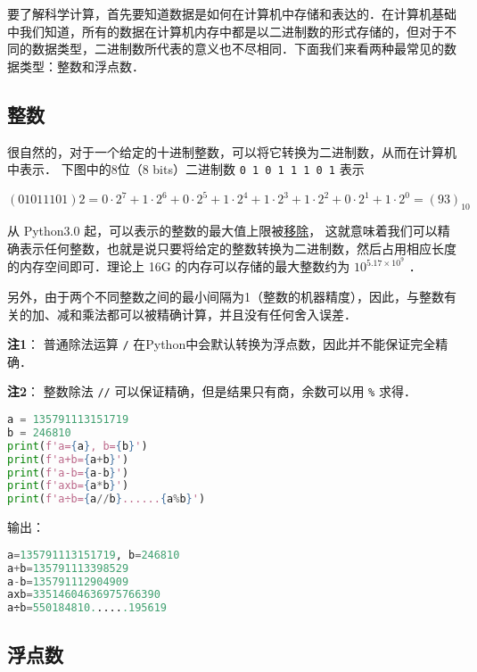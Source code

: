 

要了解科学计算，首先要知道数据是如何在计算机中存储和表达的．在计算机基础中我们知道，所有的数据在计算机内存中都是以二进制数的形式存储的，但对于不同的数据类型，二进制数所代表的意义也不尽相同．下面我们来看两种最常见的数据类型：整数和浮点数．

\subsection{整数}

很自然的，对于一个给定的十进制整数，可以将它转换为二进制数，从而在计算机中表示． 下图中的8位（8 bits）二进制数 \verb|0 1 0 1 1 1 0 1| 表示

\begin{equation}
(01011101)2=0\cdot2^7+1\cdot2^6+0\cdot2^5+1\cdot2^4+1\cdot2^3+1\cdot2^2+0\cdot2^1+1\cdot2^0=(93)_{10}
\end{equation}

从 Python3.0 起，可以表示的整数的最大值上限被\href{https://docs.python.org/3.1/whatsnew/3.0.html#integers}{移除}， 这就意味着我们可以精确表示任何整数，也就是说只要将给定的整数转换为二进制数，然后占用相应长度的内存空间即可．理论上 16G 的内存可以存储的最大整数约为  $10^{5.17\times10^9}$  ．

另外，由于两个不同整数之间的最小间隔为1（整数的机器精度），因此，与整数有关的加、减和乘法都可以被精确计算，并且没有任何舍入误差．


\textbf{注1}： 普通除法运算  \verb|/|  在Python中会默认转换为浮点数，因此并不能保证完全精确．

\textbf{注2}： 整数除法 \verb|//| 可以保证精确，但是结果只有商，余数可以用 \verb|%|  求得．

\begin{lstlisting}[language=python]
a = 135791113151719
b = 246810
print(f'a={a}, b={b}')
print(f'a+b={a+b}')
print(f'a-b={a-b}')
print(f'axb={a*b}')
print(f'a÷b={a//b}......{a%b}')
\end{lstlisting}
输出：
\begin{lstlisting}[language=python]
a=135791113151719, b=246810 
a+b=135791113398529 
a-b=135791112904909 
axb=33514604636975766390 
a÷b=550184810......195619
\end{lstlisting}


\subsection{浮点数}

